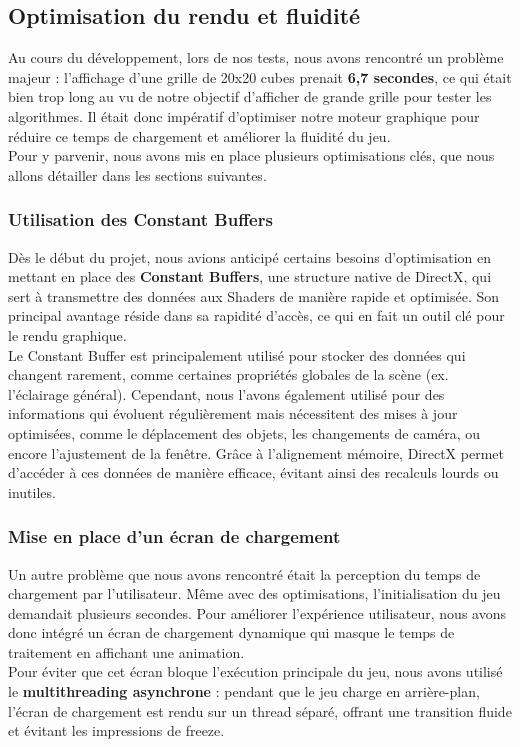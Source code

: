 \subsection{Optimisation du rendu et fluidité}
Au cours du développement, lors de nos tests, nous avons rencontré un problème majeur : l’affichage d’une grille de 20x20 cubes prenait \textbf{6,7 secondes}, ce qui était bien trop long au vu de notre objectif d’afficher de grande grille pour tester les algorithmes. Il était donc impératif d’optimiser notre moteur graphique pour réduire ce temps de chargement et améliorer la fluidité du jeu. \\
Pour y parvenir, nous avons mis en place plusieurs optimisations clés, que nous allons détailler dans les sections suivantes.

\subsubsection{Utilisation des Constant Buffers}
Dès le début du projet, nous avions anticipé certains besoins d’optimisation en mettant en place des \textbf{Constant Buffers}, une structure native de DirectX, qui sert à transmettre des données aux Shaders de manière rapide et optimisée. Son principal avantage réside dans sa rapidité d’accès, ce qui en fait un outil clé pour le rendu graphique. \\
Le Constant Buffer est principalement utilisé pour stocker des données qui changent rarement, comme certaines propriétés globales de la scène (ex. l’éclairage général). Cependant, nous l’avons également utilisé pour des informations qui évoluent régulièrement mais nécessitent des mises à jour optimisées, comme le déplacement des objets, les changements de caméra, ou encore l’ajustement de la fenêtre. Grâce à l’alignement mémoire, DirectX permet d’accéder à ces données de manière efficace, évitant ainsi des recalculs lourds ou inutiles.

\subsubsection{Mise en place d’un écran de chargement}
Un autre problème que nous avons rencontré était la perception du temps de chargement par l’utilisateur. Même avec des optimisations, l’initialisation du jeu demandait plusieurs secondes. Pour améliorer l’expérience utilisateur, nous avons donc intégré un écran de chargement dynamique qui masque le temps de traitement en affichant une animation. \\
Pour éviter que cet écran bloque l’exécution principale du jeu, nous avons utilisé le \textbf{multithreading asynchrone} : pendant que le jeu charge en arrière-plan, l’écran de chargement est rendu sur un thread séparé, offrant une transition fluide et évitant les impressions de freeze.

